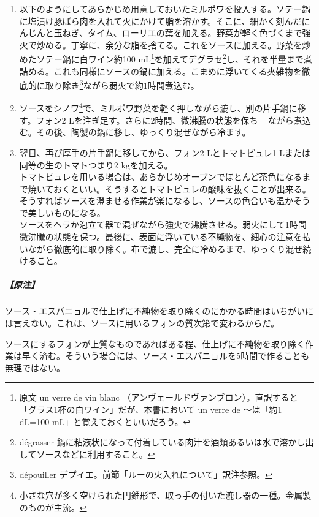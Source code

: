 \begin{recette}
\begin{enumerate}
  弱火にして\footnote{原文から直訳すると「鍋を火の脇に置く」だが、現代の調理環境では単純に「弱火にする」と解釈していい。}微沸騰の状態を保つ。
\item
  以下のようにしてあらかじめ用意しておいたミルポワを投入する。ソテー鍋に塩漬け豚ばら肉を入れて火にかけて脂を溶かす。そこに、細かく刻んだにんじんと玉ねぎ、タイム、ローリエの葉を加える。野菜が軽く色づくまで強火で炒める。丁寧に、余分な脂を捨てる。これをソースに加える。野菜を炒めたソテー鍋に白ワイン約100
  mL\footnote{原文 un verre de vin blanc
    （アンヴェールドヴァンブロン）。直訳すると「グラス1杯の白ワイン」だが、本書において
    un verre de 〜は「約1 dL=100 mL」と覚えておくといいだろう。}を加えてデグラセ\footnote{dégrasser
    鍋に粘液状になって付着している肉汁を酒類あるいは水で溶かし出してソースなどに利用すること。}し、それを半量まで煮詰める。これも同様にソースの鍋に加える。こまめに浮いてくる夾雑物を徹底的に取り除き\footnote{dépouiller
    デプイエ。前節「ルーの火入れについて」訳注参照。}ながら弱火で約1時間煮込む。
\item
  ソースをシノワ\footnote{小さな穴が多く空けられた円錐形で、取っ手の付いた漉し器の一種。金属製のものが主流。}で、ミルポワ野菜を軽く押しながら漉し、別の片手鍋に移す。フォン2
  Lを注ぎ足す。さらに2時間、微沸騰の状態を保ち ~
  ながら煮込む。その後、陶製の鍋に移し、ゆっくり混ぜながら冷ます。
\item
  翌日、再び厚手の片手鍋に移してから、フォン2 Lとトマトピュレ1
  Lまたは同等の生のトマトつまり2 kgを加える。\\
  トマトピュレを用いる場合は、あらかじめオーブンでほとんど茶色になるまで焼いておくといい。そうするとトマトピュレの酸味を抜くことが出来る。\\
  そうすればソースを澄ませる作業が楽になるし、ソースの色合いも温かそうで美しいものになる。\\
  ソースをヘラか泡立て器で混ぜながら強火で沸騰させる。弱火にして1時間微沸騰の状態を保つ。最後に、表面に浮いている不純物を、細心の注意を払いながら徹底的に取り除く。布で漉し、完全に冷めるまで、ゆっくり混ぜ続けること。
\end{enumerate}

\hypertarget{nota-sauce-espagnole}{%
\subparagraph{【原注】}\label{nota-sauce-espagnole}}

ソース・エスパニョルで仕上げに不純物を取り除くのにかかる時間はいちがいには言えない。これは、ソースに用いるフォンの質次第で変わるからだ。

ソースにするフォンが上質なものであればある程、仕上げに不純物を取り除く作業は早く済む。そういう場合には、ソース・エスパニョルを5時間で作ることも無理ではない。


\end{recette}
